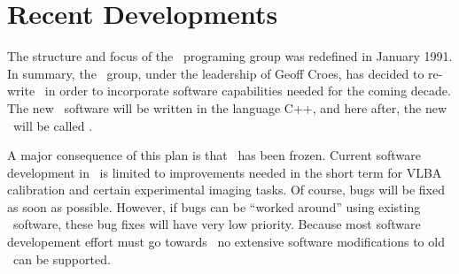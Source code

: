 

\newcommand{\AIPRELEASE}{April 15, 1991}
\newcommand{\AIPVOLUME}{Volume XI}
\newcommand{\AIPNUMBER}{Number 2}
\newcommand{\RELEASENAME}{{\tt 15APR91}}


\normalstyle
\section{Recent Developments}
The structure and focus of the \AIPS\  programing group was redefined in
January 1991.  In summary, the \AIPS\  group, under the leadership of Geoff
Croes, has decided to re-write \AIPS\  in order to incorporate software
capabilities needed for the coming decade.
The new \AIPS\  software will be written in the language C++, and here after,
the new \AIPS\  will be called \AIPTOO.

A major consequence of this plan is that \AIPS\  has been frozen.  Current
software development in \AIPS\  is limited to improvements needed in the short
term for VLBA calibration and certain experimental imaging tasks.  Of course,
bugs will be fixed as soon as possible.  However, if bugs can be ``worked
around'' using existing \AIPS\  software, these bug fixes will have very low
priority.  Because most software developement effort must go towards
\AIPTOO\, no extensive software modifications to old \AIPS\ can be supported.

